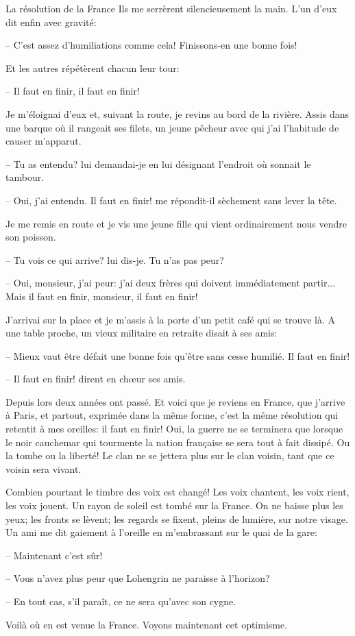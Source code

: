 \begin{chapter}{La résolution de la France}
Ils me serrèrent silencieusement la main. L'un d'eux dit enfin avec
gravité:

--  C'est assez d'humiliations comme cela! Finissons-en une bonne fois!

Et les autres répétèrent chacun leur tour:

--  Il faut en finir, il faut en finir!

Je m'éloignai d'eux et, suivant la route, je revins au bord de la
rivière. Assis dans une barque où il rangeait ses filets, un jeune
pêcheur avec qui j'ai l'habitude de causer m'apparut.

--  Tu as entendu? lui demandai-je en lui désignant l'endroit où sonnait
le tambour.

--  Oui, j'ai entendu. Il faut en finir! me répondit-il sèchement sans
lever la tête.

Je me remis en route et je vis une jeune fille qui vient ordinairement
nous vendre son poisson.

--  Tu vois ce qui arrive? lui dis-je. Tu n'as pas peur?

--  Oui, monsieur, j'ai peur: j'ai deux frères qui doivent immédiatement
partir... Mais il faut en finir, monsieur, il faut en finir!

J'arrivai sur la place et je m'assis à la porte d'un petit café qui se
trouve là. A une table proche, un vieux militaire en retraite disait à
ses amis:

--  Mieux vaut être défait une bonne fois qu'être sans cesse humilié. Il
faut en finir!

--  Il faut en finir! dirent en chœur ses amis.

\horizontalLine

Depuis lors deux années ont passé. Et voici que je reviens en France,
que j'arrive à Paris, et partout, exprimée dans la même forme, c'est la
même résolution qui retentit à mes oreilles: il faut en finir! Oui, la
guerre ne se terminera que lorsque le noir cauchemar qui tourmente la
nation française se sera tout à fait dissipé. Ou la tombe ou la liberté!
Le clan ne se jettera plus sur le clan voisin, tant que ce voisin sera
vivant.

Combien pourtant le timbre des voix est changé! Les voix chantent, les
voix rient, les voix jouent. Un rayon de soleil est tombé sur la
France. On ne baisse plus les yeux; les fronts se lèvent; les regards se
fixent, pleins de lumière, sur notre visage. Un ami me dit gaiement à
l'oreille en m'embrassant sur le quai de la gare:

--  Maintenant c'est sûr!

--  Vous n'avez plus peur que Lohengrin ne paraisse à l'horizon?

--  En tout cas, s'il paraît, ce ne sera qu'avec son cygne.

Voilà où en est venue la France. Voyons maintenant cet optimisme.

\end{chapter}

